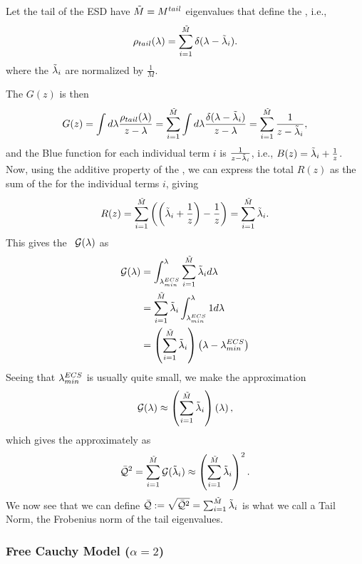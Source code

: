 Let the tail of the ESD have $\tilde{M} = M^{tail}$ eigenvalues that define the \ECS, i.e.,  
\begin{equation}
\label{eqn:spikes_model_0}
\rho_{tail}(\lambda)=\sum_{i=1}^{\tilde{M}}\delta(\lambda-\tilde{\lambda}_{i}) .
\end{equation}
where the $\tilde{\lambda}_{i}$ are normalized by $\tfrac{1}{M}$.

The \GreensFunction $G(z)$ is then
\begin{equation}
\label{eqn:spikes_model_1}
G(z) = \int d\lambda \dfrac{ \rho_{tail}(\lambda) }{z - \lambda} =
\sum_{i=1}^{\tilde{M}} \int d\lambda \dfrac{\delta(\lambda-\tilde{\lambda}_{i}) }{z - \lambda} =
\sum_{i=1}^{\tilde{M}} \dfrac{1}{z-\tilde{\lambda}_{i}}  ,
\end{equation}
and the Blue function for each individual term $i$ is $\frac{1}{z-\tilde{\lambda}_{i}}$, i.e., $B(z)=\tilde{\lambda}_{i}+\frac{1}{z}$. 
Now, using the additive property of the \RTransform, we can express the total $R(z)$ as the sum of the \RTransforms for the individual terms $i$, giving
\begin{equation}
\label{eqn:spikes_model_2}
R(z) =\sum_{i=1}^{\tilde{M}}\left(\left(\tilde{\lambda}_{i}+ \dfrac{1}{z}\right) - \dfrac{1}{z}\right)=\sum_{i=1}^{\tilde{M}}\tilde{\lambda}_{i}  .
\end{equation}
This gives the \GEN~$\mathcal{G(\lambda)}$ as
\begin{align}
\label{eqn:spikes_model_3} 
\mathcal{G(\lambda)} 
&= \int_{\lambda^{ECS}_{min}}^{\lambda}\sum_{i=1}^{\tilde{M}}\tilde{\lambda}_{i} d\lambda \\ \nonumber
&= \sum_{i=1}^{\tilde{M}}\tilde{\lambda}_{i} \int_{\lambda^{ECS}_{min}}^{\lambda} 1 d\lambda \\ \nonumber
&= \left(\sum_{i=1}^{\tilde{M}}\tilde{\lambda}_{i}\right)\left(\lambda-\lambda^{ECS}_{min}\right)
\end{align}
Seeing that $\lambda^{ECS}_{min}$ is usually quite small, we make the approximation
\begin{align}
\mathcal{G(\lambda)}  \approx \left(\sum_{i=1}^{\tilde{M}}\tilde{\lambda}_{i}\right)\left(\lambda\right)  ,
\end{align}
which gives the \QualitySquared approximately as
\begin{align}
  \label{eqn:spikes_model_4}
  \bar{\mathcal{Q}}^{2} = \sum_{i=1}^{\tilde{M}}\mathcal{G}(\tilde{\lambda}_{i}) 
 \approx\left(\sum_{i=1}^{\tilde{M}}\tilde{\lambda}_{i}\right)^{2}  .
\end{align}
We now see that we can define $\bar{\mathcal{Q}}:=\sqrt{\bar{\mathcal{Q}}^{2}}=\sum_{i=1}^{\tilde{M}}\tilde{\lambda}_{i}$ is what we call a Tail Norm,
the Frobenius norm of the tail eigenvalues.

\subsubsection{Free Cauchy Model (\texorpdfstring{$\alpha = 2$}{alpha = 2})}
\label{sxn:r_transforms:free_cauchy}

